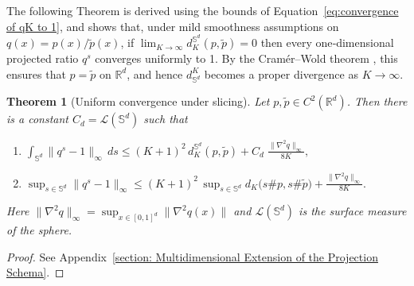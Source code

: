 \documentclass{article}
\newtheorem{theorem}{Theorem}[section]
\begin{document}
The following Theorem is derived using the bounds of Equation~\ref{eq:convergence of qK to 1}, and shows that, under mild smoothness assumptions on $q(x)=p(x)/\tilde p(x)$, if $\lim_{K\to\infty}d^{\mathbb S^d}_{K}(p,\tilde p)=0$ then every one‐dimensional projected ratio $q^s$ converges uniformly to 1.  By the Cramér--Wold theorem \cite[Thm.~29.4]{billingsley2017probability}, this ensures that $p=\tilde p$ on $\mathbb{R}^d$, and hence $d_{\mathbb S^d}^K$ becomes a proper divergence as $K\to\infty$.
\begin{theorem}[Uniform convergence under slicing]\label{thm:qs_convergence}
Let $p,\tilde p\in C^2\left(\mathbb{R}^d\right)$. Then there is a constant \(C_d=\mathcal L(\mathbb S^d)\) such that
\begin{enumerate}[label=(\roman*)]
  \item\label{thm:qs_convergence:i}
    $\displaystyle
      \int_{\mathbb S^d}\|q^s-1\|_\infty\,ds
      \le (K+1)^2\,d_{K}^{\mathbb S^d}(p,\tilde p)
      + C_d\;\frac{\|\nabla^2 q\|_\infty}{8K},
    $ 
  \item\label{thm:qs_convergence:ii}
    $\displaystyle
      \sup_{s\in\mathbb S^d}\|q^s-1\|_\infty
      \le (K+1)^2\,
      \sup_{s\in\mathbb S^d}d_K\bigl(s\#p,s\#\tilde p\bigr)
      + \frac{\|\nabla^2 q\|_\infty}{8K}.
    $
\end{enumerate}

Here \(\|\nabla^2 q\|_\infty=\sup_{x\in[0,1]^d}\|\nabla^2 q(x)\|\) and 
\(\mathcal L(\mathbb S^d)\) is the surface measure of the sphere.
\end{theorem}

\begin{proof}
See Appendix~\ref{section: Multidimensional Extension of the Projection Schema}.
\end{proof}

\end{document}
